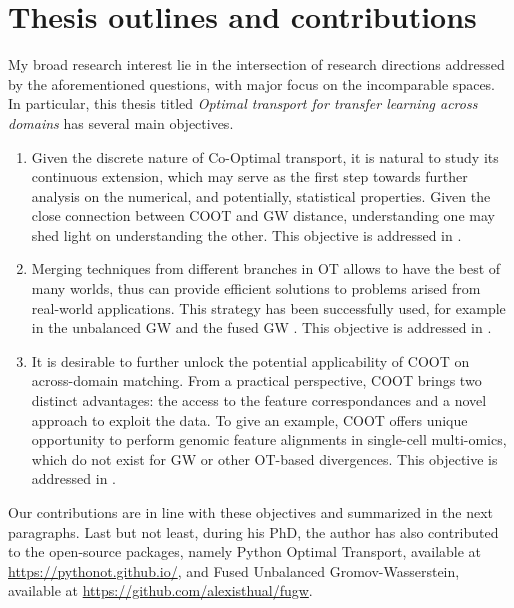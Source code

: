 \section{Thesis outlines and contributions}

My broad research interest lie in the intersection of research directions addressed
by the aforementioned questions, with major focus on the incomparable spaces.
In particular, this thesis titled
\textit{Optimal transport for transfer learning across domains} has several main objectives.
\begin{enumerate}
    \item Given the discrete nature of Co-Optimal transport, it is natural to study
    its continuous extension, which may serve as the first step towards further analysis
    on the numerical, and potentially, statistical properties. Given the close connection between
    COOT and GW distance, understanding one may shed light on understanding the other.
    This objective is addressed in .

    \item Merging techniques from different branches in OT allows to have the best of many worlds,
    thus can provide efficient solutions to problems arised from real-world applications.
    This strategy has been successfully used,
    for example in the unbalanced GW \citep{Sejourne20} and the fused GW \citep{Vayer19b}.
    This objective is addressed in .

    \item It is desirable to further unlock the potential applicability of COOT
    on across-domain matching. From a practical perspective, COOT brings two distinct advantages:
    the access to the feature correspondances and a novel approach to exploit the data.
    To give an example, COOT offers unique opportunity to perform genomic feature alignments
    in single-cell multi-omics, which do not exist for GW or other OT-based divergences.
    This objective is addressed in .
\end{enumerate}
Our contributions are in line with these objectives and summarized in the next paragraphs.
Last but not least, during his PhD, the author has also contributed to the open-source packages,
namely Python Optimal Transport, available at \url{https://pythonot.github.io/}, and
Fused Unbalanced Gromov-Wasserstein, available at \url{https://github.com/alexisthual/fugw}.

